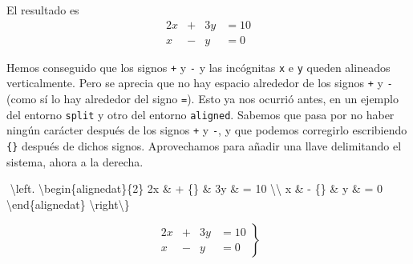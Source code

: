 \documentclass[
  letterpaper,
  DIV=11,
  numbers=noendperiod]{scrartcl}
\newenvironment{Shaded}{\begin{snugshade}}{\end{snugshade}}
\newcommand{\ExtensionTok}[1]{\textcolor[rgb]{0.00,0.23,0.31}{#1}}
\newcommand{\KeywordTok}[1]{\textcolor[rgb]{0.00,0.23,0.31}{#1}}
\newcommand{\NormalTok}[1]{\textcolor[rgb]{0.00,0.23,0.31}{#1}}
\newcommand{\SpecialCharTok}[1]{\textcolor[rgb]{0.37,0.37,0.37}{#1}}
\newcommand{\SpecialStringTok}[1]{\textcolor[rgb]{0.13,0.47,0.30}{#1}}
\begin{document}
El resultado es \[
\begin{alignedat}{2} 
2x & +    & 3y & =  10 \\ 
 x & -    &  y & =  0 
\end{alignedat}
\]

Hemos conseguido que los signos \texttt{+} y \texttt{-} y las incógnitas
\texttt{x} e \texttt{y} queden alineados verticalmente. Pero se aprecia
que no hay espacio alrededor de los signos \texttt{+} y \texttt{-} (como
sí lo hay alrededor del signo \texttt{=}). Esto ya nos ocurrió antes, en
un ejemplo del entorno \texttt{split} y otro del entorno
\texttt{aligned}. Sabemos que pasa por no haber ningún carácter después
de los signos \texttt{+} y \texttt{-}, y que podemos corregirlo
escribiendo \texttt{\{\}} después de dichos signos. Aprovechamos para
añadir una llave delimitando el sistema, ahora a la derecha.

\begin{Shaded}
\begin{Highlighting}[]
\SpecialStringTok{$$}
\SpecialCharTok{\textbackslash{}left}\SpecialStringTok{.}
\KeywordTok{\textbackslash{}begin}\NormalTok{\{}\ExtensionTok{alignedat}\NormalTok{\}}\SpecialStringTok{\{2\} }
\SpecialStringTok{2x \& + \{\}   \&  3y  \& =  10 }\SpecialCharTok{\textbackslash{}\textbackslash{}}\SpecialStringTok{ }
\SpecialStringTok{ x \& {-} \{\}   \&   y  \& =  0 }
\KeywordTok{\textbackslash{}end}\NormalTok{\{}\ExtensionTok{alignedat}\NormalTok{\}}
\SpecialCharTok{\textbackslash{}right\textbackslash{}\}}
\SpecialStringTok{$$}
\end{Highlighting}
\end{Shaded}

\[
\left.
\begin{alignedat}{2} 
2x & + {}   &  3y  & =  10 \\ 
 x & - {}   &   y  & =  0 
\end{alignedat}
\right\}
\]
\end{document}
